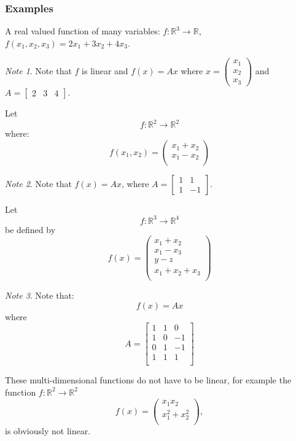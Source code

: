 \documentclass[12pt,a4paper]{article}
\theoremstyle{regla}
\theoremstyle{remark}
\newtheorem{notes}{Note}[section]
\theoremstyle{definition}
\theoremstyle{nonumberbreak}
\begin{document}
\subsubsection{Examples}
\begin{xmpl}
A real valued function of many variables: $f: \mathbb{R}^3\to\mathbb{R}$, $f(x_1,x_2,x_3)=2x_1+3x_2+4x_3$. 
\begin{notes}
Note that $f$ is linear and $f(x)=Ax$ where
$x=\begin{pmatrix} x_1\\x_2\\x_3\end{pmatrix}$ and $A=\begin{bmatrix}2&3&4\end{bmatrix}$.
\end{notes}
\end{xmpl}
\begin{xmpl}
Let 
$$
f: \mathbb{R}^{2} \rightarrow \mathbb{R}^{2}
$$
where:
$$
f(x_1,x_2) = \left(
\begin{array}{c}
x_1+x_2 \\
x_1-x_2 \\
\end{array} \right)
$$
\begin{notes}
Note that $f(x)=Ax$, where $A=\begin{bmatrix}1&1\\1&-1\end{bmatrix}$.
\end{notes}
\end{xmpl}
\begin{xmpl}
Let 
$$
f: \mathbb{R}^{3} \rightarrow \mathbb{R}^{4}
$$
be defined by
$$
f(x)
= \left(
\begin{array}{c}
x_1+x_2 \\
x_1-x_3 \\
y-z \\
x_1+x_2+x_3 \\
\end{array} \right)
$$
\begin{notes}
Note that:
$$
f(x) = Ax
$$
where
$$
A =
\begin{bmatrix}
1 & 1 & 0\\
1 & 0 & -1\\
0 & 1 & -1\\
1 & 1 & 1\\
\end{bmatrix}
$$
\end{notes}
\end{xmpl}
\begin{xmpl}
These multi-dimensional functions do not have to be linear, for example the function $f:\mathbb{R}^2\to\mathbb{R}^2$
$$
f(x) = \left(
\begin{array}{c}
x_1x_2 \\
x_1^{2}+x_2^{2}\\
\end{array} \right),
$$ 
is obviously not linear.
\end{xmpl}
\end{document}
